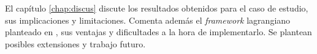 \begin{intro}
El capítulo \ref{chap:discus} discute los resultados obtenidos para el caso de estudio, sus implicaciones y limitaciones. Comenta además el  \textit{framework} lagrangiano planteado en \cite{Bichara2018}, sus ventajas y dificultades a la hora de implementarlo. Se plantean posibles extensiones y trabajo futuro.



\end{intro}

%
%




